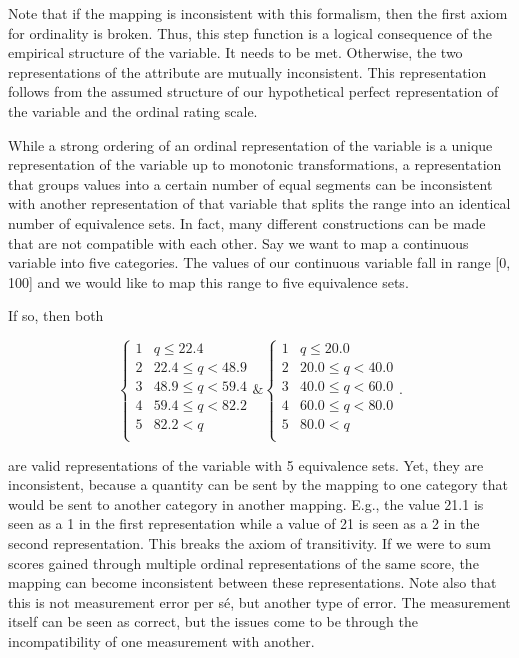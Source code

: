 \documentclass[utf8]{FrontiersinVancouver}
\begin{document}
Note that if the mapping is inconsistent with this formalism, then the first axiom for ordinality is broken. Thus, this step function is a logical consequence of the empirical structure of the variable. It needs to be met. Otherwise, the two representations of the attribute are mutually inconsistent. This representation follows from the assumed structure of our hypothetical perfect representation of the variable and the ordinal rating scale. 

While a strong ordering of an ordinal representation of the variable is a unique representation of the variable up to monotonic transformations, a representation that groups values into a certain number of equal segments can be inconsistent with another representation of that variable that splits the range into an identical number of equivalence sets. In fact, many different constructions can be made that are not compatible with each other. Say we want to map a continuous variable into five categories. The values of our continuous variable fall in range [0, 100] and we would like to map this range to five equivalence sets.

If so, then both

\[
\begin{cases} 
    1 & q \leq 22.4\\
    2 & 22.4 \leq q < 48.9\\
    3 & 48.9 \leq q < 59.4\\
    4 & 59.4 \leq q < 82.2\\    
    5 & 82.2 < q\\
\end{cases}
\&
\begin{cases} 
    1 & q \leq 20.0\\
    2 & 20.0 \leq q < 40.0\\
    3 & 40.0 \leq q < 60.0\\
    4 & 60.0 \leq q < 80.0\\    
    5 & 80.0 < q\\
\end{cases}.
\]

are valid representations of the variable with 5 equivalence sets. Yet, they are inconsistent, because a quantity can be sent by the mapping to one category that would be sent to another category in another mapping. E.g., the value 21.1 is seen as a 1 in the first representation while a value of 21 is seen as a 2 in the second representation. This breaks the axiom of transitivity. If we were to sum scores gained through multiple ordinal representations of the same score, the mapping can become inconsistent between these representations. Note also that this is not measurement error per sé, but another type of error. The measurement itself can be seen as correct, but the issues come to be through the incompatibility of one measurement with another.
\end{document}
